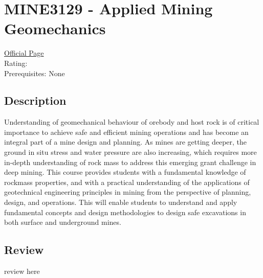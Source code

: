 \hypertarget{MINE3129}{\section{MINE3129 - Applied Mining Geomechanics}}

\large
\textcolor{turbo_purple}{\href{https://my.uq.edu.au/programs-courses/course.html?course_code=MINE3129}{Official Page}} \\
Rating: \cstar\cstar\cstar\cstar\ostar \\
Prerequisites: None

\normalsize
\subsection*{Description}
Understanding of geomechanical behaviour of orebody and host rock is of critical importance to achieve safe and efficient mining operations and has become an integral part of a mine design and planning.
As mines are getting deeper, the ground in situ stress and water pressure are also increasing, which requires more in-depth understanding of rock mass to address this emerging grant challenge in deep mining.
This course provides students with a fundamental knowledge of rockmass properties, and with a practical understanding of the applications of geotechnical engineering principles in mining from the perspective of planning, design, and operations.
This will enable students to understand and apply fundamental concepts and design methodologies to design safe excavations in both surface and underground mines.

\subsection*{Review}
review here
